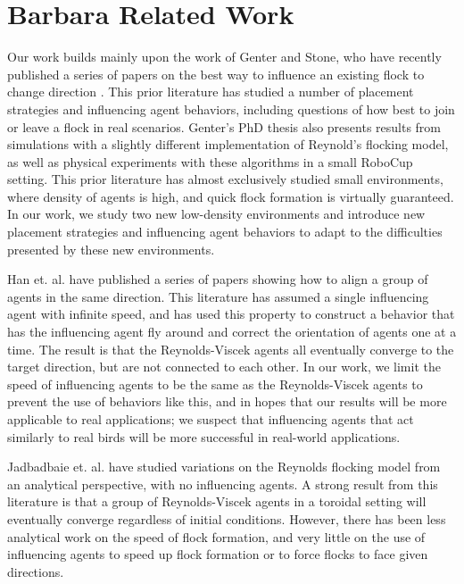 \section{Barbara Related Work}
Our work builds mainly upon the work of Genter and Stone, who have recently
published a series of papers on the best way to influence an existing flock to
change direction \cite{genter2015placement, genter2014neighborsorientherd,
genter2013visionstationary, genter2013backsearch,
genter2016facegoalfacecurrent, genter201612steplookahead}.
This prior literature has studied a number of placement strategies and
influencing agent behaviors, including questions of how best to join or leave a
flock in real scenarios.
Genter's PhD thesis also presents results from simulations with a slightly
different implementation of Reynold's flocking model, as well as physical
experiments with these algorithms in a small RoboCup setting.
This prior literature has almost exclusively studied small environments, where
density of agents is high, and quick flock formation is virtually guaranteed.
In our work, we study two new low-density environments and introduce new
placement strategies and influencing agent behaviors to adapt to the
difficulties presented by these new environments.

Han et. al. have \cite{han2010teleporting} published a series of papers showing
how to align a group of agents in the same direction.
This literature has assumed a single influencing agent with infinite speed, and
has used this property to construct a behavior that has the influencing agent
fly around and correct the orientation of agents one at a time.
The result is that the Reynolds-Viscek agents all eventually converge to the
target direction, but are not connected to each other.
In our work, we limit the speed of influencing agents to be the same as the
Reynolds-Viscek agents to prevent the use of behaviors like this, and in hopes
that our results will be more applicable to real applications; we suspect that
influencing agents that act similarly to real birds will be more successful in
real-world applications.

Jadbadbaie et. al. \cite{jad2003convergence} have studied variations on the
Reynolds flocking model from an analytical perspective, with no influencing
agents.
A strong result from this literature is that a group of Reynolds-Viscek agents
in a toroidal setting will eventually converge regardless of initial
conditions.
However, there has been less analytical work on the speed of flock formation,
and very little on the use of influencing agents to speed up flock formation or
to force flocks to face given directions.


